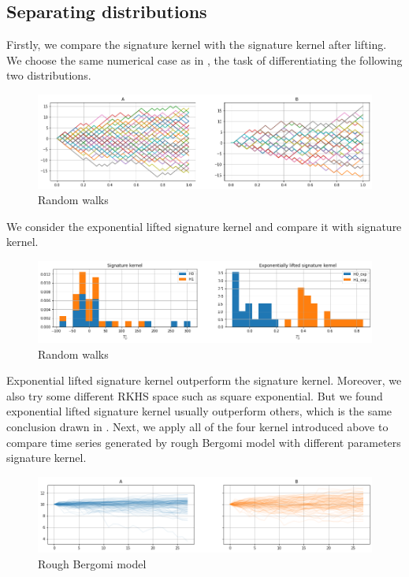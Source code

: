 \documentclass[12pt]{report}
\theoremstyle{definition}
\theoremstyle{remark}
\begin{document}
\subsection{Separating distributions}
Firstly, we compare the signature kernel with the signature kernel after lifting. We choose the same numerical case as in \cite{chevyrev2018signature}, the task of differentiating the following two distributions. 
 \begin{figure}[H]
    \centering
    \includegraphics[width=\textwidth]{figs/estimation1.png}
    \caption{Random walks}
\end{figure}
We consider the exponential lifted signature kernel and compare it with signature kernel. 
 \begin{figure}[H]
    \centering
    \includegraphics[width=\textwidth]{figs/estimation2.png}
    \caption{Random walks}
\end{figure}
Exponential lifted signature kernel outperform the signature kernel. Moreover, we also try some different RKHS space such as square exponential. But we found exponential lifted signature kernel usually outperform others, which is the same conclusion drawn in \cite{chevyrev2018signature}. Next, we apply all of the four kernel introduced above to compare time series generated by rough Bergomi model with different parameters
signature kernel. 
 \begin{figure}[H]
    \centering
    \includegraphics[width=\textwidth]{figs/estimation3.png}
    \caption{Rough Bergomi model}
\end{figure}
\end{document}

